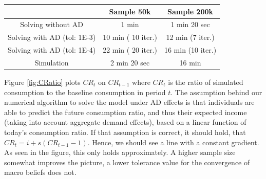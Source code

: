 \documentclass[]{article}
\begin{document}
\begin{center}
	\begin{tabular}{||c| c |c||} 
		\hline
		  & Sample 50k & Sample 200k \\ [0.5ex] 
		\hline\hline
		Solving without AD &  1 min & 1 min 20 sec  \\ \hline
		Solving with AD (tol: 1E-3) &  10 min ( 10 iter.)  & 12 min (7 iter.)  \\ \hline
		Solving with AD (tol: 1E-4) &  22 min ( 20 iter.)  & 16 min (10 iter.)  \\ \hline
		Simulation & 2 min 20 sec  & 16 min \\ [1ex] 
		\hline
	\end{tabular}
\end{center}

Figure \ref{fig:CRatio} plots $CR_t$ on  $CR_{t-1}$ where $CR_t$ is the ratio of simulated consumption to the baseline consumption in period $t$. The assumption behind our numerical algorithm to solve the model under AD effects is that individuals are able to predict the future consumption ratio, and thus their expected income (taking into account aggregate demand effects), based on a linear function of today's consumption ratio. If that assumption is correct, it should hold, that $CR_t = i + s (CR_{t-1} - 1 )$. Hence, we should see a line with a constant gradient. As seen in the figure, this only holds approximately. A higher sample size somewhat improves the picture, a lower tolerance value for the convergence of macro beliefs does not.
\end{document}
